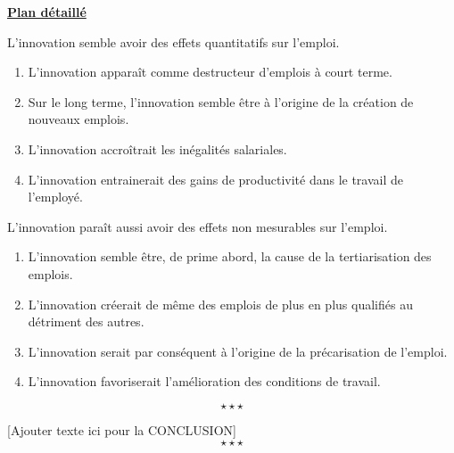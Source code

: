 \begin{center}
	{\bfseries \underline{Plan détaillé}}	
\end{center}
\begin{enumerate}[label=\Alph*.]
	{\bfseries \item {L'innovation semble avoir des effets quantitatifs sur l'emploi.}}
	\begin{enumerate}[label=\theenumi\arabic* -]
		\item \label{A.1\_UAO\_M1\_S3} {L'innovation apparaît comme destructeur d'emplois à court terme.}
		\item {Sur le long terme, l'innovation semble être à l'origine de la création de nouveaux emplois.} 
		\item {L'innovation accroîtrait les inégalités salariales.}
		\item {L'innovation entrainerait des gains de productivité dans le travail de l'employé.} 
	\end{enumerate}
	{\bfseries \item {L'innovation paraît aussi avoir des effets non mesurables sur l'emploi.}}
	\begin{enumerate}[label=\theenumi\arabic* -]
		\item {L'innovation semble être, de prime abord, la cause de la tertiarisation des emplois.}
		\item {L'innovation créerait de même des emplois de plus en plus qualifiés au détriment des autres.}  
		\item {L'innovation serait par conséquent à l'origine de la précarisation de l'emploi.}
		\item {L'innovation favoriserait l'amélioration des conditions de travail.}
	\end{enumerate}
\end{enumerate}
$$\star \star \star$$

[Ajouter texte ici pour la CONCLUSION] $$\star \star \star$$

